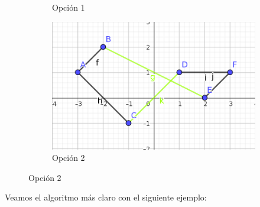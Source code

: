 \documentclass{article}
\begin{document}
\begin{enumerate}
\begin{figure}[H]
\begin{subfigure}[b]{0.3\textwidth}
        \caption{\centering Opción 1}
        \label{fig:p3_ejemplo}
    \end{subfigure}
    \hfill
    \begin{subfigure}[b]{0.3\textwidth}
        \centering
        \includegraphics[width=\textwidth]{P3/Prosa/ej_unir2.png}
        \caption{\centering Opción 2}
        \label{fig:p3_ejemplo}
    \end{subfigure}
\end{figure}
\end{enumerate}
Veamos el algoritmo más claro con el siguiente ejemplo:
\end{document}
